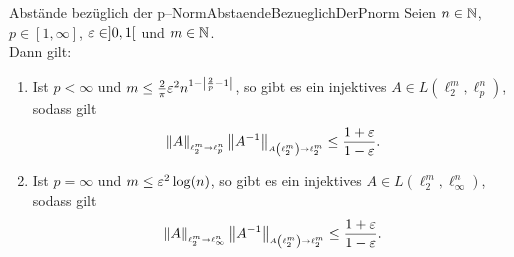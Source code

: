 \begin{korollar}{Abstände bezüglich der p--Norm}{AbstaendeBezueglichDerPnorm}
Seien $n \in \mathbb{N}$, $p \in [1, \infty]$, $\varepsilon \in \,\! ]0,1[$ und $m \in \mathbb{N}$.\\
Dann gilt:
\begin{enumerate}[(1)]
\item\label{AbstaendeBezueglichDerPnorm1} Ist $p <\infty$ und $m\le\frac 2\pi\varepsilon^2 n^{1-\left|\frac2p-1\right|}$,
so gibt es ein injektives $A\in L(\ell_2^m, \ell_p^n)$, sodass gilt
\[\left\|A\right\|_{\scriptscriptstyle{\ell_2^m \rightarrow \ell_p^n}}\left\|A^{-1}\right\|_{\scriptscriptstyle{A\left(\ell_2^m\right) \rightarrow \ell_2^m}}
\le \frac {1+\varepsilon}{1-\varepsilon}\text.\]
\item\label{AbstaendeBezueglichDerPnorm2} Ist $p = \infty$ und $m \le \varepsilon^2 \log(n)$, 
so gibt es ein injektives $A\in L(\ell_2^m, \ell_\infty^n)$, sodass gilt
\[\left\|A\right\|_{\scriptscriptstyle{\ell_2^m \rightarrow \ell_\infty^n}}\left\|A^{-1}\right\|_{\scriptscriptstyle{A\left(\ell_2^m\right) \rightarrow \ell_2^m}}
\le \frac {1+\varepsilon}{1-\varepsilon}\text.\]
\end{enumerate}
\end{korollar}
